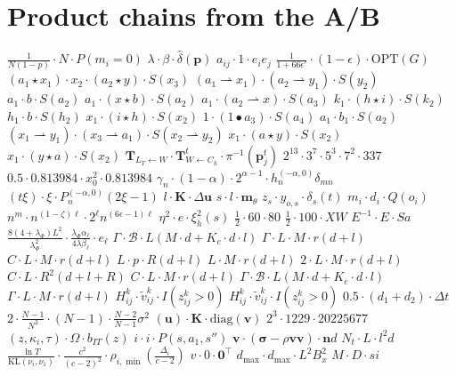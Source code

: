 \documentclass{article}
\begin{document}
\section{Product chains from the A/B}
$\frac{1}{N(1-p)} \cdot N \cdot P(m_i=0)$
$\lambda \cdot \beta \cdot \hat{\delta}(\mathbf{p})$
$a_{ij}\cdot 1\cdot e_ie_j$
$\frac{1}{1 + 66 \epsilon'} \cdot (1 - \epsilon ) \cdot \mathrm{OPT}(G)$
$(a_{1}\star x_{1})\cdot x_{2}\cdot(a_{2}\star y)\cdot S(x_{3})$
$(a_{1}\rightharpoonup x_{1})\cdot(a_{2}\rightharpoonup y_{1})\cdot S(y_{2})$
$a_{1}\cdot b\cdot S(a_{2})$
$a_{1}\cdot(x\star b)\cdot S(a_{2})$
$a_{1}\cdot(a_{2}\rightharpoonup x)\cdot S(a_{3})$
$k_1\cdot (h\star i)\cdot S(k_2)$
$h_1\cdot b\cdot S(h_2)$
$x_{1}\cdot(i\star h)\cdot S(x_{2})$
$1\cdot (1\bullet a_3)\cdot S(a_4)$
$a_1\cdot b_1\cdot S(a_2)$
$(x_{1}\rightharpoonup y_{1})\cdot(x_{3}\rightharpoonup a_{1})\cdot S(x_{2}\rightharpoonup y_{2})$
$x_1\cdot (a\star y)\cdot S(x_2)$
$x_1\cdot (y\star a)\cdot S(x_2)$
$\mathbf{T}_{L_T \leftarrow W} \cdot \mathbf{T}^t_{W \leftarrow C_k} \cdot \pi^{-1}(\mathbf{p}_j^t)$
$2^{13}\cdot 3^7\cdot 5^3\cdot 7^2\cdot 337$
$0.5 \cdot 0.813984 \cdot x_0^2 \cdot 0.813984$
$\gamma_n \cdot (1-\alpha) \cdot 2^{\alpha-1} \cdot h_n^{(-\alpha, 0)} \delta_{mn}$
$(t\xi) \cdot \xi \cdot P_n^{(-\alpha, 0)}(2\xi - 1)$
$l \cdot \boldsymbol K \cdot \Delta \boldsymbol u$
$s \cdot l \cdot \boldsymbol{m}_\theta$
$z_s\cdot y_{o,s}\cdot\delta_s(t)$
$m_i \cdot d_i \cdot Q(o_i)$
$n^m \cdot n^{(1-\zeta)\ell}\cdot 2^\ell n^{(6\epsilon-1)\ell}$
$\eta^2 \cdot e \cdot \xi_h^2(s)$
$\frac{1}{2}\cdot 60\cdot 80$
$\frac{1}{2}\cdot 100\cdot XW$
$E^{-1} \cdot E \cdot Sa$
$\frac{8(4+\lambda_\Phi)L^2}{\lambda_\Phi^2}\cdot\frac{\lambda_\Phi\alpha_\ell}{4\lambda\beta_\ell} \cdot e_\ell$
$\Gamma \cdot \mathcal{B} \cdot L(M \cdot d + K_c \cdot d \cdot l)$
$\Gamma \cdot L \cdot M \cdot r(d+l)$
$C \cdot L \cdot M \cdot r(d+l)$
$L \cdot p \cdot R(d+l)$
$L \cdot M \cdot r(d+l)$
$2 \cdot L \cdot M \cdot r(d+l)$
$C \cdot L \cdot R^2(d + l + R)$
$C \cdot L \cdot M \cdot r(d + l)$
$\Gamma \cdot \mathcal{B} \cdot L (M \cdot d + K_c \cdot d \cdot l)$
$\Gamma \cdot L \cdot M \cdot r(d + l)$
$H_{ij}^k \cdot \tilde v_{ij}^k \cdot I(z_{ij}^k > 0)$
$H_{ij}^k \cdot \tilde{v}_{ij}^k \cdot I(z_{ij}^k > 0)$
$0.5 \cdot (d_1 + d_2) \cdot \Delta t$
$2 \cdot \frac{N-1}{N^2} \cdot (N-1) \cdot \frac{N-2}{N-1} \sigma^2$
$(\bm{u}) \cdot \mathbf{K} \cdot \mathrm{diag}(\bm{v})$
$2^3\cdot 1229\cdot 20225677$
$(z, \kappa_i, \tau)\cdot \Omega \cdot b_{IT}(z)$
$i \cdot i \cdot P(s, a_1, s'')$
$\mathbf{v} \cdot (\bm{\sigma} - \rho \mathbf{v} \mathbf{v}) \cdot \mathbf{n} d$
$N_t \cdot L \cdot l^2d$
$\frac{\ln T}{\mathrm{KL}(\nu_i,\nu_1)}\cdot \frac{c^2}{(c-2)^2}\cdot \rho_{i,\min}(\frac{\Delta_i}{c-2})$
$v \cdot 0 \cdot \mathbf{0}^\top$
$d_{\max} \cdot d_{\max} \cdot L^2 B_x^2$
$M \cdot D \cdot si$
\end{document}
